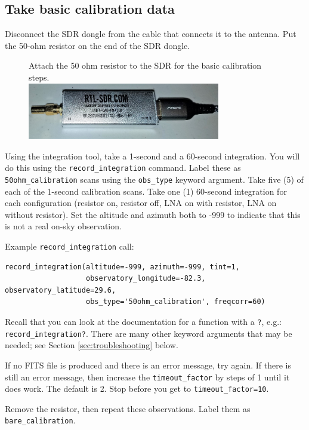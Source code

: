 \documentclass[11pt]{article}
\begin{document}
\subsection{Take basic calibration data}
Disconnect the SDR dongle from the cable that connects it to the antenna.
Put the 50-ohm resistor on the end of the SDR dongle.

\begin{figure}[htp]
    \centering
    Attach the 50 ohm resistor to the SDR for the basic calibration steps. \\
\includegraphics[width=0.75\textwidth]{RadioLabPhotos/sdr_with_resistor.jpg}
\end{figure}

Using the integration tool, take a 1-second and a 60-second integration.
You will do this using the \verb|record_integration| command.
Label these as \verb|50ohm_calibration| scans using the \verb|obs_type| keyword argument.
Take five (5) of each of the 1-second calibration scans.  Take one (1) 60-second integration
for each configuration (resistor on, resistor off, LNA on with resistor, LNA on without resistor).
Set the altitude and azimuth both to -999 to indicate that this
is not a real on-sky observation.

Example \verb|record_integration| call:\\
\begin{verbatim}
record_integration(altitude=-999, azimuth=-999, tint=1,
                   observatory_longitude=-82.3, observatory_latitude=29.6,
                   obs_type='50ohm_calibration', freqcorr=60)
\end{verbatim}
Recall that you can look at the documentation for a function with a \verb|?|, e.g.:
\verb|record_integration?|.  There are many other keyword arguments that may be needed;
see Section \ref{sec:troubleshooting} below.



If no FITS file is produced and there is an error message, try again.
If there is still an error message, then increase the \verb|timeout_factor| by steps of 1
until it does work.  The default is 2.  Stop before you get to \verb|timeout_factor=10|.

Remove the resistor, then repeat these observations.  Label them as \verb|bare_calibration|.
\end{document}
